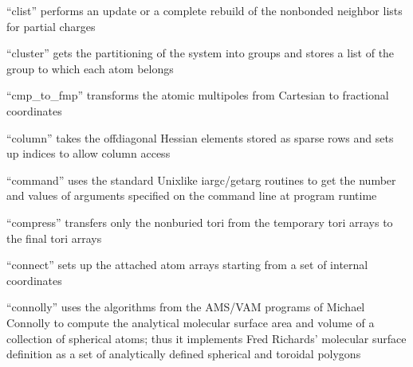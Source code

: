 \documentclass[letterpaper,11pt,english]{sphinxmanual}
\begin{document}
\sphinxAtStartPar
{}

\sphinxAtStartPar
{}

\sphinxAtStartPar
{}

\sphinxAtStartPar
{}

\sphinxAtStartPar
{}

\sphinxAtStartPar
{}

\sphinxAtStartPar
“clist” performs an update or a complete rebuild of the nonbonded neighbor lists for partial charges

\sphinxAtStartPar
{}

\sphinxAtStartPar
“cluster” gets the partitioning of the system into groups and stores a list of the group to which each atom belongs

\sphinxAtStartPar
{}

\sphinxAtStartPar
“cmp\_to\_fmp” transforms the atomic multipoles from Cartesian to fractional coordinates

\sphinxAtStartPar
{}

\sphinxAtStartPar
“column” takes the off\sphinxhyphen{}diagonal Hessian elements stored as sparse rows and sets up indices to allow column access

\sphinxAtStartPar
{}

\sphinxAtStartPar
“command” uses the standard Unix\sphinxhyphen{}like iargc/getarg routines to get the number and values of arguments specified on the command line at program runtime

\sphinxAtStartPar
{}

\sphinxAtStartPar
“compress” transfers only the non\sphinxhyphen{}buried tori from the temporary tori arrays to the final tori arrays

\sphinxAtStartPar
{}

\sphinxAtStartPar
“connect” sets up the attached atom arrays starting from a set of internal coordinates

\sphinxAtStartPar
{}

\sphinxAtStartPar
“connolly” uses the algorithms from the AMS/VAM programs of Michael Connolly to compute the analytical molecular surface area and volume of a collection of spherical atoms; thus it implements Fred Richards’ molecular surface definition as a set of analytically defined spherical and toroidal polygons
\end{document}
